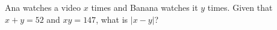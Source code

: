 Ana watches a video $x$ times and Banana watches it $y$ times. Given that $x+y=52$ and $xy=147$, what is $|x-y|$?

